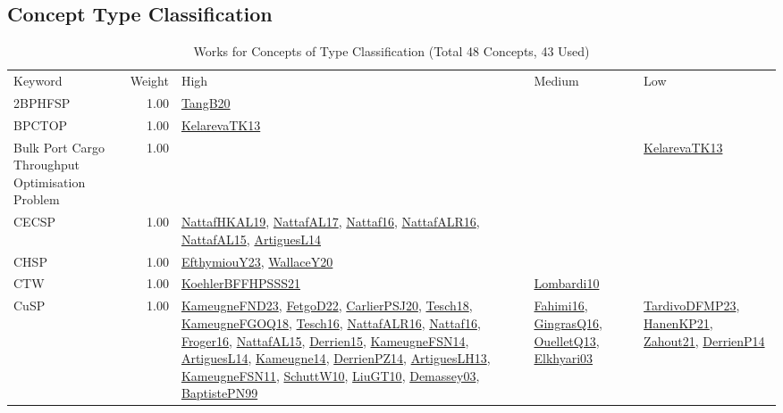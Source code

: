 \subsection{Concept Type Classification}
\label{sec:Classification}
\label{Classification}
{\scriptsize
\begin{longtable}{p{3cm}r>{\raggedright\arraybackslash}p{6cm}>{\raggedright\arraybackslash}p{6cm}>{\raggedright\arraybackslash}p{8cm}}
\rowcolor{white}\caption{Works for Concepts of Type Classification (Total 48 Concepts, 43 Used)}\\ \toprule
\rowcolor{white}Keyword & Weight & High & Medium & Low\\ \midrule\endhead
\bottomrule
\endfoot
\index{2BPHFSP}\index{Classification!2BPHFSP}2BPHFSP &  1.00 & \hyperref[detail:TangB20]{TangB20} &  & \\
\index{BPCTOP}\index{Classification!BPCTOP}BPCTOP &  1.00 & \hyperref[detail:KelarevaTK13]{KelarevaTK13} &  & \\
\index{Bulk Port Cargo Throughput Optimisation Problem}\index{Classification!Bulk Port Cargo Throughput Optimisation Problem}Bulk Port Cargo Throughput Optimisation Problem &  1.00 &  &  & \hyperref[detail:KelarevaTK13]{KelarevaTK13}\\
\index{CECSP}\index{Classification!CECSP}CECSP &  1.00 & \hyperref[detail:NattafHKAL19]{NattafHKAL19}, \hyperref[detail:NattafAL17]{NattafAL17}, \hyperref[detail:Nattaf16]{Nattaf16}, \hyperref[detail:NattafALR16]{NattafALR16}, \hyperref[detail:NattafAL15]{NattafAL15}, \hyperref[detail:ArtiguesL14]{ArtiguesL14} &  & \\
\index{CHSP}\index{Classification!CHSP}CHSP &  1.00 & \hyperref[detail:EfthymiouY23]{EfthymiouY23}, \hyperref[detail:WallaceY20]{WallaceY20} &  & \\
\index{CTW}\index{Classification!CTW}CTW &  1.00 & \hyperref[detail:KoehlerBFFHPSSS21]{KoehlerBFFHPSSS21} & \hyperref[detail:Lombardi10]{Lombardi10} & \\
\index{CuSP}\index{Classification!CuSP}CuSP &  1.00 & \hyperref[detail:KameugneFND23]{KameugneFND23}, \hyperref[detail:FetgoD22]{FetgoD22}, \hyperref[detail:CarlierPSJ20]{CarlierPSJ20}, \hyperref[detail:Tesch18]{Tesch18}, \hyperref[detail:KameugneFGOQ18]{KameugneFGOQ18}, \hyperref[detail:Tesch16]{Tesch16}, \hyperref[detail:NattafALR16]{NattafALR16}, \hyperref[detail:Nattaf16]{Nattaf16}, \hyperref[detail:Froger16]{Froger16}, \hyperref[detail:NattafAL15]{NattafAL15}, \hyperref[detail:Derrien15]{Derrien15}, \hyperref[detail:KameugneFSN14]{KameugneFSN14}, \hyperref[detail:ArtiguesL14]{ArtiguesL14}, \hyperref[detail:Kameugne14]{Kameugne14}, \hyperref[detail:DerrienPZ14]{DerrienPZ14}, \hyperref[detail:ArtiguesLH13]{ArtiguesLH13}, \hyperref[detail:KameugneFSN11]{KameugneFSN11}, \hyperref[detail:SchuttW10]{SchuttW10}, \hyperref[detail:LiuGT10]{LiuGT10}, \hyperref[detail:Demassey03]{Demassey03}, \hyperref[detail:BaptistePN99]{BaptistePN99} & \hyperref[detail:Fahimi16]{Fahimi16}, \hyperref[detail:GingrasQ16]{GingrasQ16}, \hyperref[detail:OuelletQ13]{OuelletQ13}, \hyperref[detail:Elkhyari03]{Elkhyari03} & \hyperref[detail:TardivoDFMP23]{TardivoDFMP23}, \hyperref[detail:HanenKP21]{HanenKP21}, \hyperref[detail:Zahout21]{Zahout21}, \hyperref[detail:DerrienP14]{DerrienP14}\\

\end{longtable}}
